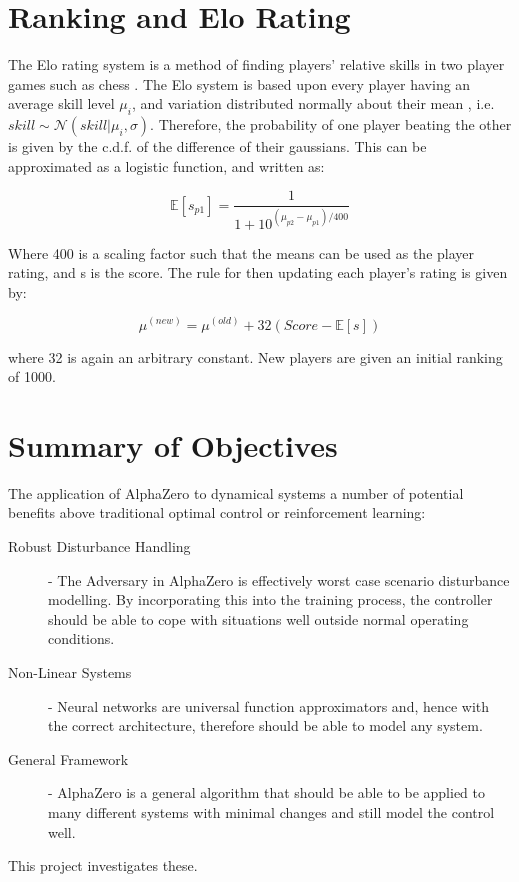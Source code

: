 \documentclass[../main.tex]{subfiles}
\begin{document}
\section{Ranking and Elo Rating}

The Elo rating system is a method of finding players' relative skills in two player games such as chess \cite{elo}. The Elo system is based upon every player having an average skill level $\mu_i$, and variation distributed normally about their mean , i.e. $skill \sim \mathcal{N}(skill | \mu_i, \sigma)$. Therefore, the probability of one player beating the other is given by the c.d.f. of the difference of their gaussians. This can be approximated as a logistic function, and written as:

\begin{equation}
   \label{equ:elo}
   \mathbb{E}[s_{p1}] = \frac{1}{1+10^{(\mu_{p2} - \mu_{p1})/400}}
\end{equation}

Where 400 is a scaling factor such that the means can be used as the player rating, and s is the score. The rule for then updating each player's rating is given by:

\begin{equation}
   \mu^{(new)} = \mu^{(old)} + 32(Score - \mathbb{E}[s])
\end{equation}

where 32 is again an arbitrary constant. New players are given an initial ranking of 1000.

\section{Summary of Objectives}

The application of AlphaZero to dynamical systems a number of potential benefits above traditional optimal control or reinforcement learning:
\begin{description}
    \item[Robust Disturbance Handling] - The Adversary in AlphaZero is effectively worst case scenario disturbance modelling. By incorporating this into the training process, the controller should be able to cope with situations well outside normal operating conditions.
    \item[Non-Linear Systems] - Neural networks are universal function approximators and, hence with the correct architecture, therefore should be able to model any system.
    \item[General Framework] - AlphaZero is a general algorithm that should be able to be applied to many different systems with minimal changes and still model the control well. 
\end{description}

This project investigates these.

\onlyinsubfile{}
\end{document}
